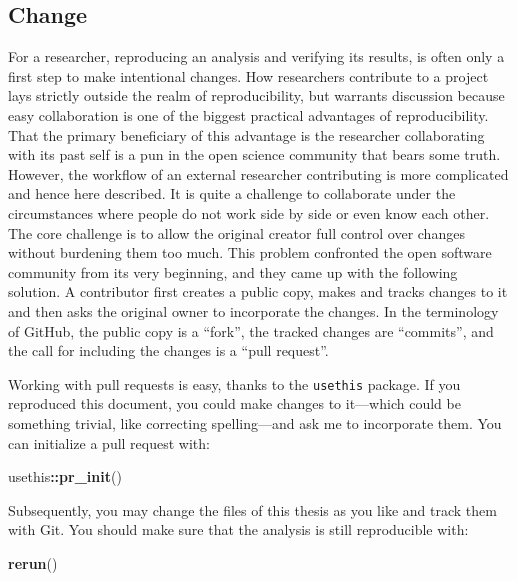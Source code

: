 \documentclass[12pt,a4paper,twoside]{article}
\newenvironment{Shaded}{\begin{snugshade}}{\end{snugshade}}
\newcommand{\KeywordTok}[1]{\textcolor[rgb]{0.13,0.29,0.53}{\textbf{#1}}}
\newcommand{\NormalTok}[1]{#1}
\newcommand{\OperatorTok}[1]{\textcolor[rgb]{0.81,0.36,0.00}{\textbf{#1}}}
\begin{document}
\hypertarget{change}{%
\subsection{Change}\label{change}}

For a researcher, reproducing an analysis and verifying its results, is often only a first step to make intentional changes.
How researchers contribute to a project lays strictly outside the realm of reproducibility, but warrants discussion because easy collaboration is one of the biggest practical advantages of reproducibility.
That the primary beneficiary of this advantage is the researcher collaborating with its past self is a pun in the open science community that bears some truth.
However, the workflow of an external researcher contributing is more complicated and hence here described.
It is quite a challenge to collaborate under the circumstances where people do not work side by side or even know each other.
The core challenge is to allow the original creator full control over changes without burdening them too much.
This problem confronted the open software community from its very beginning, and they came up with the following solution.
A contributor first creates a public copy, makes and tracks changes to it and then asks the original owner to incorporate the changes.
In the terminology of GitHub, the public copy is a ``fork'', the tracked changes are ``commits'', and the call for including the changes is a ``pull request''.

Working with pull requests is easy, thanks to the \texttt{usethis} package.
If you reproduced this document, you could make changes to it---which could be something trivial, like correcting spelling---and ask me to incorporate them.
You can initialize a pull request with:

\begin{Shaded}
\begin{Highlighting}[]
\NormalTok{usethis}\OperatorTok{::}\KeywordTok{pr_init}\NormalTok{()}
\end{Highlighting}
\end{Shaded}

Subsequently, you may change the files of this thesis as you like and track them with Git.
You should make sure that the analysis is still reproducible with:

\begin{Shaded}
\begin{Highlighting}[]
\KeywordTok{rerun}\NormalTok{()}
\end{Highlighting}
\end{Shaded}
\end{document}
